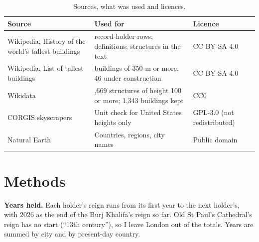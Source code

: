 \documentclass[11pt,a4paper]{article}
\begin{document}
\begin{table}[tbp]\centering\small\caption{Sources, what was used and licences.}\label{tab:sources}\begin{tabular}{>{\raggedright\arraybackslash}p{3.6cm}>{\raggedright\arraybackslash}p{7.2cm}>{\raggedright\arraybackslash}p{2.6cm}}\toprule Source & Used for & Licence\\\midrule
Wikipedia, History of the world's tallest buildings & 22 record-holder rows; definitions; structures in the text & CC BY-SA 4.0\\
Wikipedia, List of tallest buildings & 98 buildings of 350 m or more; 46 under construction & CC BY-SA 4.0\\
Wikidata & 4,669 structures of height 100 or more; 1,343 buildings kept & CC0\\
CORGIS skyscrapers & Unit check for United States heights only & GPL-3.0 (not redistributed)\\
Natural Earth & Countries, regions, city names & Public domain\\
\bottomrule\end{tabular}\end{table}

\section{Methods}
\textbf{Years held.} Each holder's reign runs from its first year to the next holder's, with 2026 as the end of the Burj Khalifa's reign so far. Old St Paul's Cathedral's reign has no start (``13th century''), so I leave London out of the totals. Years are summed by city and by present-day country.
\end{document}
